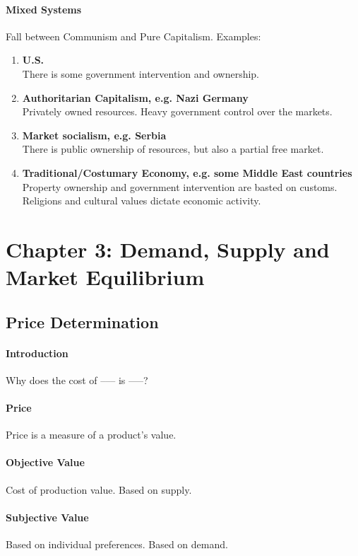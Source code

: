 \paragraph{Mixed Systems} Fall between Communism and Pure Capitalism. Examples:

\begin{enumerate}[label = \textbullet]
	\item \textbf{U.S.}\\There is some government intervention and ownership.\\[-1ex]

	\item \textbf{Authoritarian Capitalism, e.g. Nazi Germany} \\ Privately owned resources. Heavy government control over the markets.\\[-1ex]

	\item \textbf{Market socialism, e.g. Serbia} \\ There is public ownership of resources, but also a partial free market.\\[-1ex]

	\item \textbf{Traditional/Costumary Economy, e.g. some Middle East countries} \\ Property ownership and government intervention are basted on customs. Religions and cultural values dictate economic activity.
\end{enumerate}

\newpage
\section{Chapter 3: Demand, Supply and Market Equilibrium}

\subsection{Price Determination}

\paragraph{Introduction} Why does the cost of ––– is –––?

\paragraph{Price} Price is a measure of a product's value.

\paragraph{Objective Value} Cost of production value. Based on supply.

\paragraph{Subjective Value} Based on individual preferences. Based on demand.
